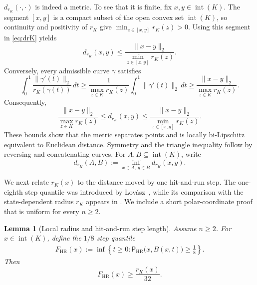 \documentclass[11pt]{article}
\newtheorem{lemma}[theorem]{Lemma}
\theoremstyle{definition}
\theoremstyle{remark}
\newcommand{\HRzero}{\mathsf P_{\mathrm{HR}}}
\newcommand{\rK}{r_K}
\begin{document}
$d_{\rK}(\cdot,\cdot)$ is indeed a metric.  To see that it is finite, fix
$x,y\in\operatorname{int}(K)$.  The segment $[x,y]$ is a compact subset of
the open convex set $\operatorname{int}(K)$, so continuity and positivity of
$\rK$ give $\min_{z\in[x,y]}\rK(z)>0$. Using this segment in \eqref{eq:drK} yields
\[
 d_{\rK}(x,y)\le\frac{\|x-y\|_2}{\min_{z\in[x,y]}\rK(z)}.
\]
Conversely, every admissible curve $\gamma$ satisfies
\[
 \int_0^1\frac{\|\gamma'(t)\|_2}{\rK(\gamma(t))}\,dt
 \ge
 \frac1{\max_{z\in K}\rK(z)}\int_0^1\|\gamma'(t)\|_2\,dt
 \ge
 \frac{\|x-y\|_2}{\max_{z\in K}\rK(z)}.
\]
Consequently,
\begin{equation}\label{eq:rK_bounds}
 \frac{\|x-y\|_2}{\max_{z\in K}\rK(z)}
 \le d_{\rK}(x,y)
 \le\frac{\|x-y\|_2}{\min_{z\in[x,y]}\rK(z)}.
\end{equation}
These bounds show that the metric separates points and is locally
bi-Lipschitz equivalent to Euclidean distance.  Symmetry and the triangle
inequality follow by reversing and concatenating curves.  For
$A,B\subseteq\operatorname{int}(K)$, write
\[
 d_{\rK}(A,B):=\inf_{x\in A,\,y\in B}d_{\rK}(x,y).
\]

We next relate $\rK(x)$ to the distance moved by one hit-and-run
step.  The one-eighth step quantile was introduced by Lov\'asz~\cite[Section~3]{LovaszHR}, while its comparison with the state-dependent radius $\rK$ appears in \cite[Lemma~3.2]{LV}.  We include a short polar-coordinate proof that is uniform for every $n\ge2$.

\begin{lemma}[Local radius and hit-and-run step length]
\label{lem:step-quantile}
Assume $n\ge2$.  For $x\in\operatorname{int}(K)$, define the $1/8$
step quantile
\begin{align}\label{eq:def_F_HR}
 F_{\mathrm{HR}}(x)
 :=
 \inf\left\{
 t\ge0:
 \HRzero\bigl(x,B(x,t)\bigr)\ge\frac18
 \right\}.
\end{align}
Then
\begin{equation}\label{eq:step-quantile}
 F_{\mathrm{HR}}(x)\ge\frac{\rK(x)}{32}.
\end{equation}
\end{lemma}
\end{document}
